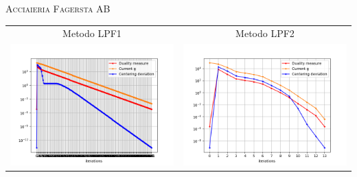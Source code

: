 \begin{frame}{\textsc{\LARGE \textcolor{iris}{Acciaieria Fagersta AB}}}
	\centering
	\begin{tabular}{c@{}c}
		\small{Metodo LPF1} & \small{Metodo LPF2} \\
		\includegraphics[scale = 0.33]{swe_LPF1}
		&\includegraphics[scale = 0.33]{swe_LPF2}\\ 
	\end{tabular}
\end{frame}

